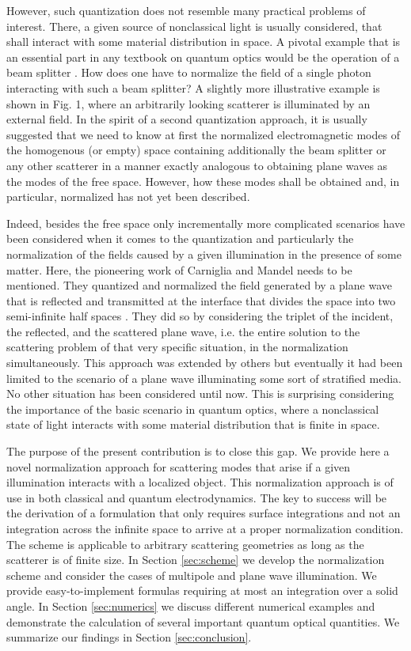 \documentclass[10pt,letterpaper]{article}
\begin{document}
However, such quantization does not resemble many practical problems of interest. There, a given source of nonclassical light is usually considered, that shall interact with some material distribution in space. A pivotal example that is an essential part in any textbook on quantum optics would be the operation of a beam splitter \cite{schleich2011quantum}. How does one have to normalize the field of a single photon interacting with such a beam splitter? A slightly more illustrative example is shown in Fig. 1, where an arbitrarily looking scatterer is illuminated by an external field. In the spirit of a second quantization approach, it is usually suggested that we need to know at first the normalized electromagnetic modes of the homogenous (or empty) space containing additionally the beam splitter or any other scatterer in a manner exactly analogous to obtaining plane waves as the modes of the free space. However, how these modes shall be obtained and, in particular, normalized has not yet been described.

Indeed, besides the free space only incrementally more complicated scenarios have been considered when it comes to the quantization and particularly the normalization of the fields caused by a given illumination in the presence of some matter. Here, the pioneering work of Carniglia and Mandel needs to be mentioned. They quantized and normalized the field generated by a plane wave that is reflected and transmitted at the interface that divides the space into two semi-infinite half spaces \cite{Carniglia1971}. They did so by considering the triplet of the incident, the reflected, and the scattered plane wave, i.e. the entire solution to the scattering problem of that very specific situation, in the normalization simultaneously. This approach was extended by others \cite{Khosravi1991, Rigneault1997, vial2014quasimodal} but eventually it had been limited to the scenario of a plane wave illuminating some sort of stratified media. No other situation has been considered until now. This is surprising considering the importance of the basic scenario in quantum optics, where a nonclassical state of light interacts with some material distribution that is finite in space.


The purpose of the present contribution is to close this gap. We provide here a novel normalization approach for scattering modes that arise if a given illumination interacts with a localized object. This normalization approach is of use in both classical and quantum electrodynamics. The key to success will be the derivation of a formulation that only requires surface integrations and not an integration across the infinite space to arrive at a proper normalization condition. The scheme is applicable to arbitrary scattering geometries as long as the scatterer is of finite size. In Section \ref{sec:scheme} we develop the normalization scheme and consider the cases of multipole and plane wave illumination. We provide easy-to-implement formulas requiring at most an integration over a solid angle. In Section \ref{sec:numerics} we discuss different numerical examples and demonstrate the calculation of several important quantum optical quantities. We summarize our findings in Section \ref{sec:conclusion}.
\end{document}
